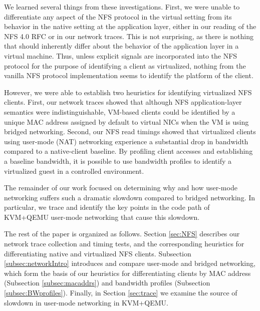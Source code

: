 \documentclass[letterpaper,twocolumn,11pt]{article}
\begin{document}
We learned several things from these investigations. First, we were unable to differentiate any aspect of the NFS protocol in the virtual setting from its behavior in the native setting at the application layer, either in our reading of the NFS 4.0 RFC or in our network traces. This is not surprising, as there is nothing that should inherently differ about the behavior of the application layer in a virtual machine. Thus, unless explicit signals are incorporated into the NFS protocol for the purpose of identifying a client as virtualized, nothing from the vanilla NFS protocol implementation seems to identify the platform of the client. 

However, we were able to establish two heuristics for identifying virtualized NFS clients. First, our network traces showed that although NFS application-layer semantics were indistinguishable, VM-based clients could be identified by a unique MAC address assigned by default to virtual NICs when the VM is using bridged networking. Second, our NFS read timings showed that virtualized clients using user-mode (NAT) networking experience a substantial drop in bandwidth compared to a native-client baseline. By profiling client accesses and establishing a baseline bandwidth, it is possible to use bandwidth profiles to identify a virtualized guest in a controlled environment.

The remainder of our work focused on determining why and how user-mode networking suffers such a dramatic slowdown compared to bridged networking. In particular, we trace and identify the key points in the code path of KVM+QEMU user-mode networking that cause this slowdown.

The rest of the paper is organized as follows. Section \ref{sec:NFS} describes our network trace collection and timing tests, and the corresponding heuristics for differentiating native and virtualized NFS clients. Subsection \ref{subsec:networkIntro} introduces and compare user-mode and bridged networking, which form the basis of our heuristics for differentiating clients by MAC address (Subsection \ref{subsec:macaddrs}) and bandwidth profiles (Subsection \ref{subsec:BWprofiles}). Finally, in Section \ref{sec:trace} we examine the source of slowdown in user-mode networking in KVM+QEMU.


%
\end{document}
